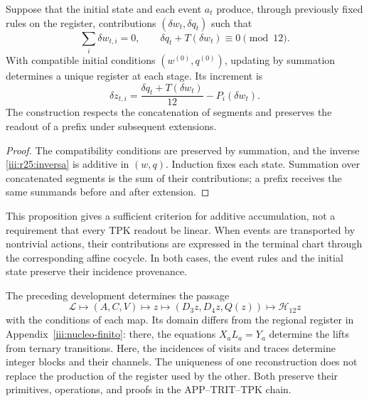 \begin{proposition}
\label{iii:r25:eventos}
Suppose that the initial state and each event $a_t$ produce,
through previously fixed rules on the register, contributions
$(\delta w_t,\delta q_t)$ such that
\[
 \sum_i\delta w_{t,i}=0,
 \qquad \delta q_t+T(\delta w_t)\equiv0\pmod {12}.
\]
With compatible initial conditions $(w^{(0)},q^{(0)})$,
updating by summation determines a unique register at each stage.
Its increment is
\[
 \delta z_{t,i}=
 \frac{\delta q_t+T(\delta w_t)}{12}-P_i(\delta w_t).
\]
The construction respects the concatenation of segments and preserves
the readout of a prefix under subsequent extensions.
\end{proposition}
\begin{proof}
The compatibility conditions are preserved by summation, and the
inverse \eqref{iii:r25:inversa} is additive in $(w,q)$.
Induction fixes each state. Summation over concatenated segments
is the sum of their contributions; a prefix receives the same
summands before and after extension.
\end{proof}

This proposition gives a sufficient criterion for additive
accumulation, not a requirement that every TPK readout be linear.
When events are transported by nontrivial actions, their
contributions are expressed in the terminal chart through the
corresponding affine cocycle. In both cases, the event rules and the
initial state preserve their incidence provenance.

The preceding development determines the passage
\[
 \mathscr L\longmapsto(A,C,V)\longmapsto z
 \longmapsto(D_3z,D_4z,Q(z))\longmapsto\mathcal H_{12}z
\]
with the conditions of each map. Its domain differs from the
regional register in Appendix~\ref{iii:nucleo-finito}: there, the
equations $X_aL_a=Y_a$ determine the lifts from
ternary transitions. Here, the incidences of visits and traces
determine integer blocks and their channels. The uniqueness of one
reconstruction does not replace the production of the register used
by the other. Both preserve their primitives, operations, and proofs
in the APP--TRIT--TPK chain.
